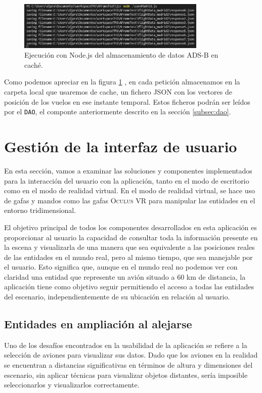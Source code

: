 \documentclass[a4paper, 11pt]{book}
\begin{document}
\begin{figure}[h]
  \centering
  \includegraphics[width=9cm, keepaspectratio]{img/captura_datos_madrid.jpg}
  \caption{Ejecución con Node.js del almacenamiento de datos ADS-B en caché.}
  \label{fig:capturaDatosCache}
\end{figure}

Como podemos apreciar en la figura \ref{fig:capturaDatosCache} , en cada petición almacenamos en la carpeta local que usaremos de cache, un fichero \textsc{\gls{JSON}} con los vectores de posición de los vuelos en ese instante temporal.
Estos ficheros podrán ser leídos por el \texttt{DAO}, el componte anteriormente descrito en la sección \ref{subsec:dao}.
\clearpage
\section{Gestión de la interfaz de usuario}
\label{sec:gui}
En esta sección, vamos a examinar las soluciones y componentes implementados para la interacción del usuario con la aplicación, tanto en el modo de escritorio como en el modo de realidad virtual. En el modo de realidad virtual, se hace uso de gafas y mandos como las gafas \textsc{Oculus VR} para manipular las entidades en el entorno tridimensional.

El objetivo principal de todos los componentes desarrollados en esta aplicación es proporcionar al usuario la capacidad de consultar toda la información presente en la escena y visualizarla de una manera que sea equivalente a las posiciones reales de las entidades en el mundo real, pero al mismo tiempo, que sea manejable por el usuario. Esto significa que, aunque en el mundo real no podemos ver con claridad una entidad que represente un avión situado a 60 km de distancia, la aplicación tiene como objetivo seguir permitiendo el acceso a todas las entidades del escenario, independientemente de su ubicación en relación al usuario.
\subsection{Entidades en ampliación al alejarse}
\label{subsec:hover-scale}
Uno de los desafíos encontrados en la usabilidad de la aplicación se refiere a la selección de aviones para visualizar sus datos. Dado que los aviones en la realidad se encuentran a distancias significativas en términos de altura y dimensiones del escenario, sin aplicar técnicas para visualizar objetos distantes, sería imposible seleccionarlos y visualizarlos correctamente.
\end{document}
